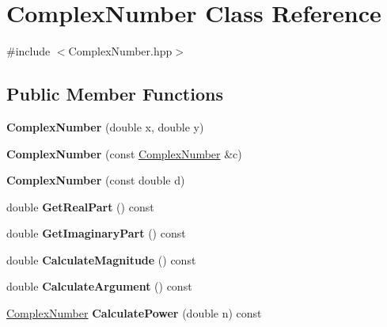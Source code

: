 \hypertarget{class_complex_number}{}\section{Complex\+Number Class Reference}
\label{class_complex_number}


{\ttfamily \#include $<$Complex\+Number.\+hpp$>$}

\subsection*{Public Member Functions}
\begin{DoxyCompactItemize}
\item 
\mbox{\label{class_complex_number_a2226acaab891160ba96a93249f624ae8}} 
{\bfseries Complex\+Number} (double x, double y)
\item 
\mbox{\label{class_complex_number_a39b29f461cfdec50516415054e583907}} 
{\bfseries Complex\+Number} (const \hyperlink{class_complex_number}{Complex\+Number} \&c)
\item 
\mbox{\label{class_complex_number_af09f875c9fe74b4e037fe0c112f87021}} 
{\bfseries Complex\+Number} (const double d)
\item 
\mbox{\label{class_complex_number_a06a85cd26304575eb711b758de7ed48c}} 
double {\bfseries Get\+Real\+Part} () const
\item 
\mbox{\label{class_complex_number_abc6aa475c80076146c0b3694be4c6d1a}} 
double {\bfseries Get\+Imaginary\+Part} () const
\item 
\mbox{\label{class_complex_number_a81652b57d845e3563edd86fce526704e}} 
double {\bfseries Calculate\+Magnitude} () const
\item 
\mbox{\label{class_complex_number_a4bc3501f6b8f3a55c9bc7a560095b0ff}} 
double {\bfseries Calculate\+Argument} () const
\item 
\mbox{\label{class_complex_number_a9f6d9f39c74e0f2487a940dd6d15f0a8}} 
\hyperlink{class_complex_number}{Complex\+Number} {\bfseries Calculate\+Power} (double n) const

\end{DoxyCompactItemize}
